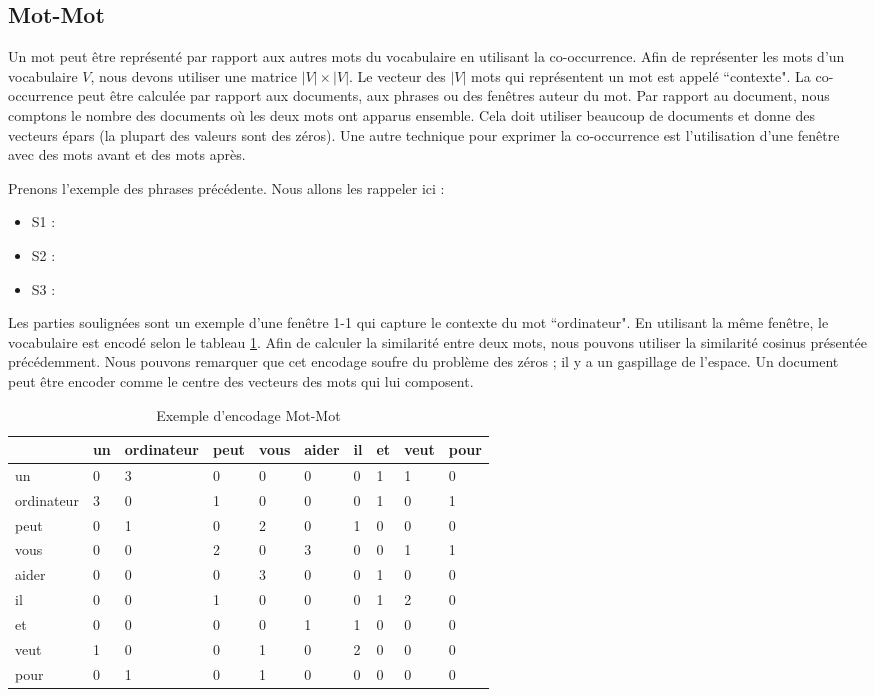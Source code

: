 \documentclass{KodeBook}
\begin{document}
\subsection{Mot-Mot}

Un mot peut être représenté par rapport aux autres mots du vocabulaire en utilisant la co-occurrence. 
Afin de représenter les mots d'un vocabulaire  $ V $, nous devons utiliser une matrice $|V| \times |V|$. 
Le vecteur des  $|V|$ mots qui représentent un mot est appelé ``contexte".
La co-occurrence peut être calculée par rapport aux documents, aux phrases ou des fenêtres auteur du mot. 
Par rapport au document, nous comptons le nombre des documents où les deux mots ont apparus ensemble. 
Cela doit utiliser beaucoup de documents et donne des vecteurs épars (la plupart des valeurs sont des zéros).
Une autre technique pour exprimer la co-occurrence est l'utilisation d'une fenêtre avec des mots avant et des mots après.

Prenons l'exemple des phrases précédente. 
Nous allons les rappeler ici : 
\begin{itemize}
	\item S1 : 
	\item S2 : 
	\item S3 : 
\end{itemize}
Les parties soulignées sont un exemple d'une fenêtre 1-1 qui capture le contexte du mot ``ordinateur". 
En utilisant la même fenêtre, le vocabulaire est encodé selon le tableau \ref{tab:catmot-mot}. 
Afin de calculer la similarité entre deux mots, nous pouvons utiliser la similarité cosinus présentée précédemment.
Nous pouvons remarquer que cet encodage soufre du problème des zéros ; il y a un gaspillage de l'espace.
Un document peut être encoder comme le centre des vecteurs des mots qui lui composent.
\begin{table}[ht]
\centering
\begin{tabular}{llllllllll}
	\hline\hline
	& un & ordinateur & peut & vous & aider & il & et & veut & pour \\
	\hline
	un & 0 & 3 & 0 & 0 & 0 & 0 & 1 & 1 & 0\\
	ordinateur & 3 & 0 & 1 & 0 & 0 & 0 & 1 & 0 & 1\\
	peut & 0 & 1 & 0 & 2 & 0 & 1 & 0 & 0 & 0\\
	vous & 0 & 0 & 2 & 0 & 3 & 0 & 0 & 1 & 1\\
	aider & 0 & 0 & 0 & 3 & 0 & 0 & 1 & 0 & 0\\
	il & 0 & 0 & 1 & 0 & 0 & 0 & 1 & 2 & 0\\
	et & 0 & 0 & 0 & 0 & 1 & 1 & 0 & 0 & 0\\
	veut & 1 & 0 & 0 & 1 & 0 & 2 & 0 & 0 & 0\\
	pour & 0 & 1 & 0 & 1 & 0 & 0 & 0 & 0 & 0\\
	\hline\hline
\end{tabular}
\caption{Exemple d'encodage Mot-Mot}
\label{tab:catmot-mot}
\end{table}
\end{document}
